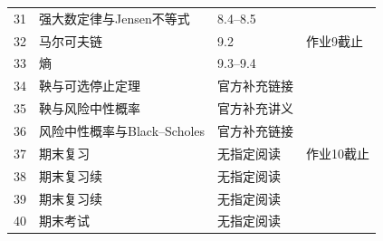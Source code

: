 \begin{longtable}{@{}p{.07\linewidth}p{.44\linewidth}p{.20\linewidth}p{.19\linewidth}@{}}
31 & 强大数定律与Jensen不等式 & 8.4--8.5 & \\
32 & 马尔可夫链 & 9.2 & 作业9截止\\
33 & 熵 & 9.3--9.4 & \\
34 & 鞅与可选停止定理 & 官方补充链接 & \\
35 & 鞅与风险中性概率 & 官方补充讲义 & \\
36 & 风险中性概率与Black--Scholes & 官方补充链接 & \\
37 & 期末复习 & 无指定阅读 & 作业10截止\\
38 & 期末复习续 & 无指定阅读 & \\
39 & 期末复习续 & 无指定阅读 & \\
40 & 期末考试 & 无指定阅读 & \\
\bottomrule
\end{longtable}
